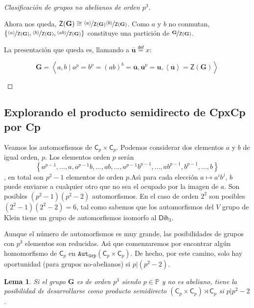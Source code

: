\documentclass[final,12pt,a4paper,twoside,fleqn]{extbook}
\newcommand{\entreangulos}[1]{\ensuremath{\left\langle{#1}\right\rangle}}
\newcommand{\mathdef}{\ensuremath{\stackrel{\mathsf{def}}{{}={}}}}
\newcommand{\set}[1]{\ensuremath{\left\lbrace{#1}\right\rbrace}}
\newcommand{\setP}{\ensuremath{}\mathbb{P}}
\newcommand{\generadoporUitem}[1]{\ensuremath{
        \entreangulos{#1}
}}
\newcommand{\generadopor}[1]{\ensuremath{
        \generadoporUitem{#1}
}}
\newcommand{\grG}{\ensuremath{\mathbf{G}}}
\newcommand{\graut}[1]{\ensuremath{{\mathtt{Aut}}_{\mathtt{Grp}}{\left({#1}\right)}}}
\newcommand{\grcoc}[2]{\ensuremath{
        \nicefrac{#1}{#2}
}}
\newcommand{\grclass}[1]{\ensuremath{\mathsf{#1}}}
\newcommand{\cyclicgr}[1]{\ensuremath{{\grclass{C}}_{#1}}}
\newcommand{\pd}[2]{\ensuremath{{#1}\!          \times          \!{#2}}}
\newcommand{\psd}[2]{\ensuremath{{#1}\!\rtimes\!{#2}}}
\newcommand{\pdcyclics}[2]{\ensuremath{\pd{\cyclicgr{#1}}{\cyclicgr{#2}}}}
\newcommand{\dihgr}[1]{\ensuremath{{\grclass{Dih}}_{#1}}}
\newcommand{\centro}[1]{\ensuremath{
        {\mathsf{Z}}
        {\left({#1}\right)}
}}
\newcommand{\neutromult}{\ensuremath{\mathbf{u}}}
\newcommand{\unity}{\ensuremath{\neutromult}}
\newtheorem{lem}[thm]{Lema}
\theoremstyle{definition}
\theoremstyle{remark}
\begin{document}
\begin{proof}[Clasificaci\'on de grupos no abelianos de orden $p^3$]
\begin{itemize}
\begin{itemize}
    Ahora nos queda, $\centro{\grG}         \cong
    {\grcoc{\generadopor{a}}{\centro{\grG}}}
    {\grcoc{\generadopor{b}}{\centro{\grG}}}
    $. Como $a$ y $b$ no conmutan, $\set{
        \grcoc{\generadopor{a}}{\centro{\grG}},
        \grcoc{\generadopor{b}}{\centro{\grG}},
        \grcoc{\generadopor{ab}}{\centro{\grG}}
    }
    $ constituye una partici\'on de $\grcoc{\grG}{\centro{\grG}}$.

    La presentaci\'on que queda es, llamando a $\overline{\unity}\mathdef x$:

    \[
    \grG=\generadopor{a,b ∣a^p=b^p=(ab)^b=\overline{\unity},{\overline{\unity}}^p=\unity,\generadopor{\overline{\unity}}=\centro{\grG}}
    \]

\end{itemize}
\end{itemize}
\end{proof}

\subsection{Explorando el producto semidirecto de CpxCp por Cp}

Veamos los automorfismos de $\pdcyclics{p}{p}$. Podemos considerar dos elementos $a$ y $b$ de igual orden, $p$. Los elementos orden $p$ ser\'an
\[\set{a^{p-1},\dots,a,a^{p-1}b,\ldots,ab,\ldots,a^{p-1}b^{p-1},\ldots,ab^{p-1},b^{p-1},\ldots,b}\]
, en total son $p^2-1$ elementos de orden $p$.As{\'{\i}} para cada elecci\'on $a         \mapsto a^ib^j$, $b$ puede enviarse a cualquier otro que no sea el ocupado por la imagen de $a$. Son posibles $(p^2-1)(p^2-2)$ automorfismos. En el caso de orden $2^2$ son posibles $(2^2-1)(2^2-2)=6$, tal como sabemos que los automorfismos del $V$ grupo de Klein tiene un grupo de automorfismos isomorfo al $\dihgr{3}$.

Aunque el n\'umero de automorfismos es muy grande, las posibilidades de grupos con $p^3$ elementos son reducidas. As{\'{\i}} que comenzaremos por encontrar alg\'un homomorfismo de $\cyclicgr{p}$ en $\graut{\pdcyclics{p}{p}}$. De hecho, por este camino, solo hay oportunidad (para grupos no-abelianos) si $p|(p^2-2)$.

\begin{lem}
Si el grupo $\grG$ es de orden $p^3$ siendo $p         \in \setP$ y no es abeliano, tiene la posibilidad de desarrollarse como producto semidirecto $\psd{(\pdcyclics{p}{p})}{\cyclicgr{p}}$ si $p|p^2-2$.
\end{lem}
\end{document}
